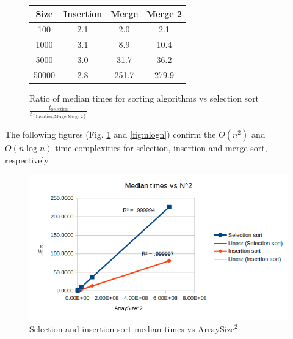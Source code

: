 \documentclass[a4paper,11pt]{article}
\begin{document}
    \begin{figure}[H]
        \centering
        \begin{tabular}{c|c|c|c}
            Size & Insertion & Merge & Merge 2 \\
            \hline
            \hline
            100 & 2.1 & 2.0 & 2.1 \\
            \hline
            1000 & 3.1 & 8.9 & 10.4 \\
            \hline
            5000 & 3.0 & 31.7 & 36.2 \\
            \hline
            50000 & 2.8 & 251.7 & 279.9 \\
        \end{tabular}

        \caption{Ratio of median times for sorting algorithms vs selection sort $\frac{t_{\text{Selection}}}{t_{\left\{\text{Insertion}, \text{Merge}, \text{Merge 2}\right\}}}$}
    \end{figure}

    The following figures (Fig. \ref{fig:n2} and \ref{fig:nlogn}) confirm the $O(n^2)$ and $O(n \log n)$ time complexities for selection, insertion and merge sort, respectively.

    \begin{figure}[H]
        \centering
        \includegraphics[width=\textwidth]{n2.png}
        \caption{Selection and insertion sort median times vs $\text{ArraySize}^2$}
        \label{fig:n2}   
    \end{figure}
\end{document}

